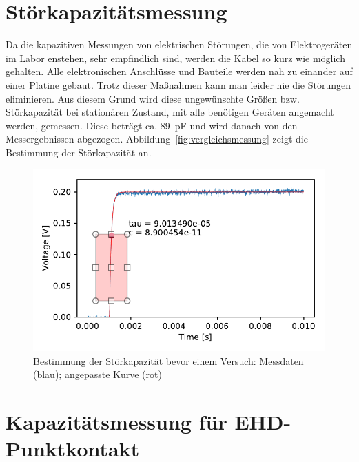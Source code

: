 \section{Störkapazitätsmessung}
\label{sec:stoerkapazitaetsmessung}

Da die kapazitiven Messungen von elektrischen Störungen, die von Elektrogeräten im Labor enstehen, sehr empfindlich sind, werden die Kabel so kurz wie möglich gehalten.
Alle elektronischen Anschlüsse und Bauteile werden nah zu einander auf einer Platine gebaut.
Trotz dieser Maßnahmen kann man leider nie die Störungen eliminieren.
Aus diesem Grund wird diese ungewünschte Größen bzw. Störkapazität bei stationären Zustand, mit alle benötigen Geräten angemacht werden, gemessen.
Diese beträgt ca. \SI{89}{\pico\farad} und wird danach von den Messergebnissen abgezogen.
Abbildung~\ref{fig:vergleichsmessung} zeigt die Bestimmung der Störkapazität an.

\begin{figure}[htb]
    \centering
    \includegraphics[]{./images/background_capacitance.pdf}
    \caption{Bestimmung der Störkapazität bevor einem Versuch: Messdaten (blau); angepasste Kurve (rot)}
    \label{fig:background_capacitance}
\end{figure}

\section{Kapazitätsmessung für EHD-Punktkontakt}
\label{sec:kapazitaetsmessung_punktkontakt}

